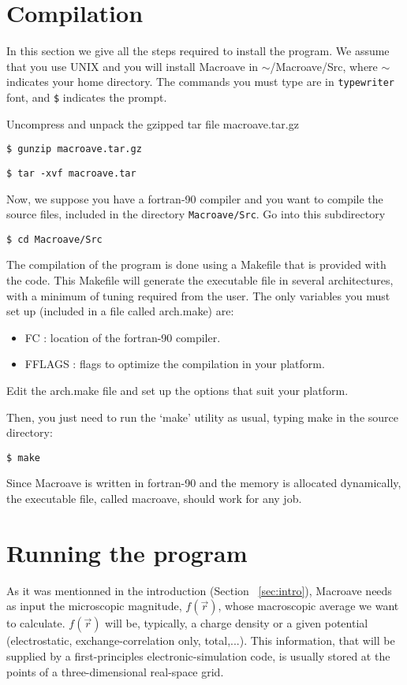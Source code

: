 \section{Compilation}

\noindent

 In this section we give all the steps required to install
 the program.
 We assume that you use UNIX and you will install {\sc Macroave} in
 $\sim$/Macroave/Src, where $\sim$ indicates your home directory.
 The commands you must type are in {\tt typewriter} font,
 and {\tt \$} indicates the prompt.

 Uncompress and unpack the gzipped tar file macroave.tar.gz

 {\tt \$ gunzip macroave.tar.gz}

 {\tt \$ tar -xvf macroave.tar}

 Now, we suppose you have a fortran-90 compiler and you want to compile
 the source files, included in the directory  {\tt Macroave/Src}.
 Go into this subdirectory

 {\tt \$ cd Macroave/Src}

 The compilation of the program is done using a Makefile that is
 provided with the code. This Makefile will generate the
 executable file in several architectures, with a minimum of tuning
 required from the user. The only variables you must set up
 (included in a file called arch.make) are:

  \begin{itemize}
    \item FC : location of the fortran-90 compiler.
    \item FFLAGS : flags to optimize the compilation in your platform.
  \end{itemize}

 Edit the arch.make file and set up the options that suit your platform.

 Then, you just need to run the `make' utility
 as usual, typing make in the source directory:

 {\tt \$ make}

 Since {\sc Macroave} is written in fortran-90 and the memory
 is allocated dynamically,
 the executable file, called macroave, should work for any job.

\section{Running the program}

 As it was mentionned in the introduction (Section ~\ref{sec:intro}),
 {\sc Macroave} needs as input the microscopic magnitude,
 $f \left( \vec{r} \right)$, whose macroscopic average we want to calculate.
 $f \left( \vec{r} \right)$ will be, typically, a charge density
 or a given potential (electrostatic, exchange-correlation only, total,...).
 This information, that will be supplied by a first-principles
 electronic-simulation code,
 is usually stored at the points of a three-dimensional
 real-space grid.

